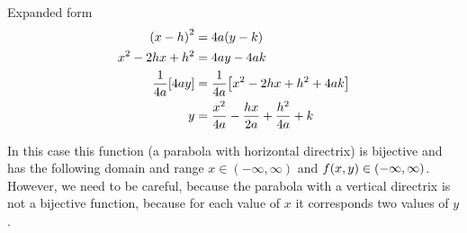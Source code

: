 \documentclass[../main-notes.tex]{subfiles}
\begin{document}
\begin{note}{Expanded form}{~}
 \begin{align*}
    \qty(x-h)^2 &= 4a\qty(y-k) \\
    x^2 -2hx +h^2 &= 4ay-4ak \\
    \frac{1}{4a}\qty[4ay] &=\frac{1}{4a}\qty[x^2 -2hx + h^2 +4ak] \\
    y &=\frac{x^2}{4a} -\frac{hx}{2a} +\frac{h^2}{4a}  +k 
\end{align*}

In this case this function (a parabola with horizontal directrix) is bijective and has the following domain and range $x\in(-\infty,\infty)$ and $f(x,y)\in\qty(-\infty,\infty)$.
However, we need to be careful, because the parabola with a vertical directrix is not a bijective function, because for each value of $x$ it corresponds two values of $y$.
   
\end{note}


\end{document}
